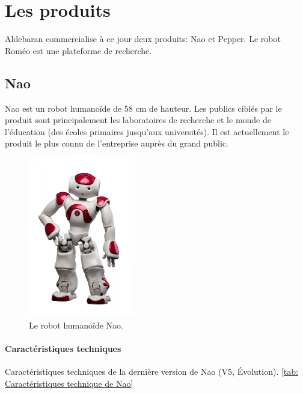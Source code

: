 \section{Les produits}
\label{Entreprise: Les produits}
Aldebaran commercialise à ce jour deux produits: Nao et Pepper. Le robot Roméo est une plateforme de recherche. 

\subsection{Nao}
\label{Entreprise: Les produits: Nao}
Nao est un robot humanoïde de 58 cm de hauteur. Les publics ciblés par le produit sont principalement les laboratoires de recherche et le monde de l'éducation (des écoles primaires jusqu'aux universités). Il est actuellement le produit le plus connu de l'entreprise auprès du grand public. 

\begin{figure}[h]
	\centering\includegraphics[height=7cm]{images/nao.jpg}
	\caption{Le robot humanoïde Nao.}
	\label{fig:Robot humanoïde Nao}
\end{figure}

\paragraph{Caractéristiques techniques}
\label{Entreprise:Les produits: Nao: Caractéristiques techniques}
Caractéristiques techniques de la dernière version de Nao (V5, Évolution). \ref{tab: Caractéristiques technique de Nao}

